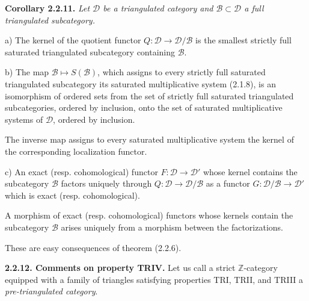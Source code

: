 \clearpage
{}%
\begingroup
\small
\setlength{\parskip}{0pt}%
\setlength{\emergencystretch}{1.5em}%

\noindent\textbf{Corollary 2.2.11.}\quad
\begingroup\itshape
{}%
Let $\mathcal D$ be a triangulated category and
$\mathcal B\subset\mathcal D$ a full triangulated subcategory.

\par\noindent a) The kernel of the quotient functor
$Q\colon\mathcal D\longrightarrow\mathcal D/\mathcal B$ is the smallest
strictly full saturated triangulated subcategory containing $\mathcal B$.

\par\noindent b) The map
$\mathcal B\longmapsto S(\mathcal B)$, which assigns to every strictly
full saturated triangulated subcategory its saturated multiplicative
system (2.1.8), is an isomorphism of ordered sets from the set of strictly
full saturated triangulated subcategories, ordered by inclusion, onto the
set of saturated multiplicative systems of $\mathcal D$, ordered by
inclusion.

The inverse map assigns to every saturated multiplicative system the kernel
of the corresponding localization functor.

\par\noindent c) An exact (resp. cohomological) functor
$F\colon\mathcal D\longrightarrow\mathcal D'$ whose kernel contains the
subcategory $\mathcal B$ factors uniquely through
$Q\colon\mathcal D\longrightarrow\mathcal D/\mathcal B$ as a functor
$G\colon\mathcal D/\mathcal B\longrightarrow\mathcal D'$ which is exact
(resp. cohomological).

A morphism of exact (resp. cohomological) functors whose kernels contain
the subcategory $\mathcal B$ arises uniquely from a morphism between the
factorizations.
\endgroup

These are easy consequences of theorem (2.2.6).

\smallskip
\noindent\textbf{2.2.12. Comments on property TRIV.}
%
Let us call a strict $\mathbb Z$-category equipped with a family of
triangles satisfying properties TRI, TRII, and TRIII a
\emph{pre-triangulated category}.

